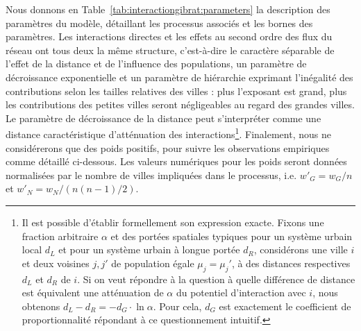 {Nous donnons en Table~\ref{tab:interactiongibrat:parameters} la description des paramètres du modèle, détaillant les processus associés et les bornes des paramètres. Les interactions directes et les effets au second ordre des flux du réseau ont tous deux la même structure, c'est-à-dire le caractère séparable de l'effet de la distance et de l'influence des populations, un paramètre de décroissance exponentielle et un paramètre de hiérarchie exprimant l'inégalité des contributions selon les tailles relatives des villes : plus l'exposant est grand, plus les contributions des petites villes seront négligeables au regard des grandes villes. Le paramètre de décroissance de la distance peut s'interpréter comme une distance caractéristique d'atténuation des interactions\footnote{Il est possible d'établir formellement son expression exacte. Fixons une fraction arbitraire $\alpha$ et des portées spatiales typiques pour un système urbain local $d_L$ et pour un système urbain à longue portée $d_R$, considérons une ville $i$ et deux voisines $j,j'$ de population égale $\mu_j=\mu_j'$, à des distances respectives $d_L$ et $d_R$ de $i$. Si on veut répondre à la question à quelle différence de distance est équivalent une atténuation de $\alpha$ du potentiel d'interaction avec $i$, nous obtenons $d_L - d_R = -d_G\cdot \ln \alpha$. Pour cela, $d_G$ est exactement le coefficient de proportionnalité répondant à ce questionnement intuitif.}. Finalement, nous ne considérerons que des poids positifs, pour suivre les observations empiriques comme détaillé ci-dessous. Les valeurs numériques pour les poids seront données normalisées par le nombre de villes impliquées dans le processus, i.e. ${w'}_G = w_G / n$ et ${w'}_N = w_N / (n (n-1) / 2)$.
}



